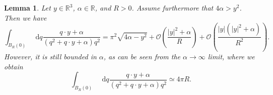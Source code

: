 \documentclass[a4paper,11pt]{article}
\newcommand{\abs}[1]{\left\lvert #1 \right\rvert}
\newcommand*\diff{\mathop{}\!\mathrm{d}}
\newcommand{\R}{\mathbb{R}}
\newtheorem{lemma}{Lemma}
\numberwithin{equation}{section}
\begin{document}
\begin{lemma}\label{IntegralApproximationLemma}
	Let $ y\in\R^3 $, $ \alpha\in\R $, and $ R>0 $. Assume furthermore that $ 4\alpha>y^2 $. Then we have \begin{equation}
	\int_{B_R(0)} \diff q\frac{q\cdot y+\alpha}{(q^2+q\cdot y+\alpha)q^2}=\pi^2\sqrt{4\alpha-y^2}+\mathcal{O}\left(\frac{\abs{y}^2+\alpha}{R}\right)+\mathcal{O}\left(\frac{\abs{y}(\abs{y}^2+\alpha)}{R^2}\right).
	\end{equation}
	However, it is still bounded in $ \alpha $, as can be seen from the $ \alpha\to\infty $ limit, where we obtain\begin{equation}
	\int_{B_R(0)} \diff q\frac{q\cdot y+\alpha}{(q^2+q\cdot y+\alpha)q^2}\simeq 4\pi R.
	\end{equation}
\end{lemma}
\end{document}
